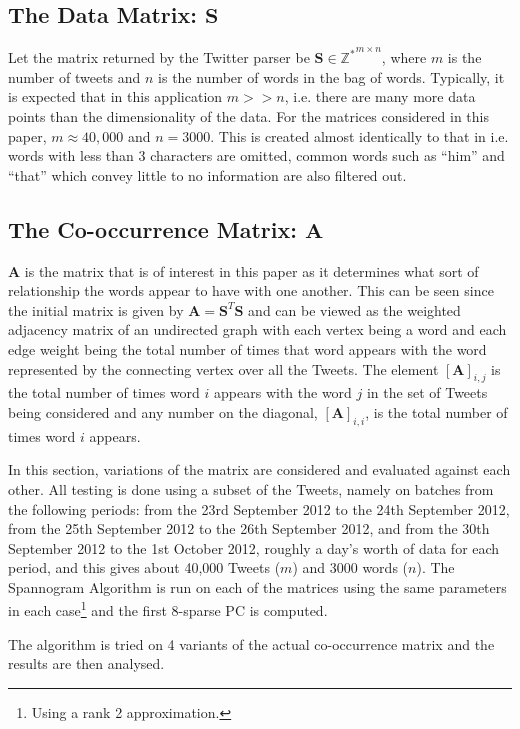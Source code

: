 \documentclass[graybox]{svmult}
\newcommand{\smat}{\mathbf{S}}
\newcommand{\covmat}{\mathbf{A}}
\newcommand{\tp}{^T}
\begin{document}
\subsection{The Data Matrix: $\smat$}
Let the matrix returned by the Twitter parser be $\mathbf{S} \in \mathbb{Z^*}^{m \times n}$, where $m$ is the number of tweets and $n$ is the number of words in the bag of words. Typically, it is expected that in this application $m >> n$, i.e. there are many more data points than the dimensionality of the data. For the matrices considered in this paper, $m \approx 40,000$ and $n = 3000$. This is created almost identically to that in \cite{dimakis} i.e. words with less than 3 characters are omitted, common words such as ``him'' and ``that'' which convey little to no information are also filtered out.

\subsection{The Co-occurrence Matrix: $\mathbf{A}$}
\label{covmat}

$\mathbf{A}$ is the matrix that is of interest in this paper as it determines what sort of relationship the words appear to have with one another. This can be seen since the initial matrix is given by $\covmat = \smat\tp\smat$ and can be viewed as the weighted adjacency matrix of an undirected graph with each vertex being a word and each edge weight being the total number of times that word appears with the word represented by the connecting vertex over all the Tweets. The element $[\covmat]_{i, j}$ is the total number of times word $i$ appears with the word $j$ in the set of Tweets being considered and any number on the diagonal, $[\covmat]_{i, i}$, is the total number of times word $i$ appears. 

In this section, variations of the matrix are considered and evaluated against each other. All testing is done using a subset of the Tweets, namely on batches from the following periods: from the 23rd September 2012 to the 24th September 2012, from the 25th September 2012 to the 26th September 2012, and from the 30th September 2012 to the 1st October 2012, roughly a day's worth of data for each period, and this gives about 40,000 Tweets ($m$) and 3000 words ($n$). The Spannogram Algorithm is run on each of the matrices using the same parameters in each case\footnote{Using a rank 2 approximation.} and the first 8-sparse PC is computed.

The algorithm is tried on 4 variants of the actual co-occurrence matrix and the results are then analysed. 
\end{document}
